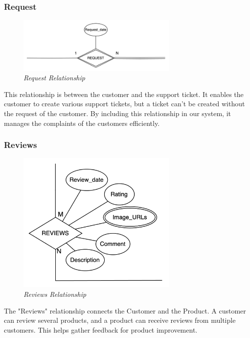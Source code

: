 \documentclass[11pt]{article}
\begin{document}
\subsubsection{Request}
\begin{figure}[H]
  \centering
  \includegraphics[width=0.7\textwidth]{images/relationships/request.png}
  \caption{\textit{Request Relationship}}
\end{figure}

This relationship is between the customer and the support ticket. It enables the customer to create various support tickets, but a ticket can't be created without the request of the customer. By including this relationship in our system, it manages the complaints of the customers efficiently.

\subsubsection{Reviews}
\begin{figure}[H]
  \centering
  \includegraphics[width=0.7\textwidth]{images/relationships/reviews.png}
  \caption{\textit{Reviews Relationship}}
\end{figure}

The "Reviews" relationship connects the Customer and the Product. A customer can review several products, and a product can receive reviews from multiple customers. This helps gather feedback for product improvement.
\end{document}
